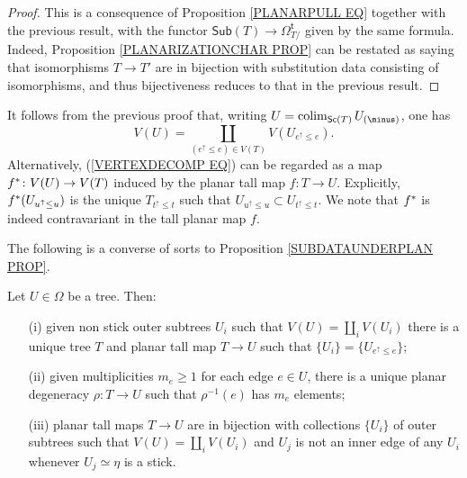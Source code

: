 \documentclass[a4paper,10pt]{article}%
\begin{document}
\begin{proof}
  This is a consequence of Proposition \ref{PLANARPULL EQ} together with the previous result, with the functor 
  $\mathsf{Sub}(T) \to \Omega_{T/}^{\mathsf{t}}$ given by the same formula.
  Indeed, Proposition \ref{PLANARIZATIONCHAR PROP} can be restated as saying that isomorphisms $T \to T'$ are in bijection with substitution data consisting of isomorphisms, and thus  bijectiveness reduces to that in the previous result.
\end{proof}


\begin{remark}\label{VERTEXDECOMP REM}
  It follows from the previous proof that, writing 
  $U = \colim_{\mathsf{Sc}(T)}U_{(\minus)}$,
  one has 
  \begin{equation}\label{VERTEXDECOMP EQ}
    V(U) = \coprod_{(e^{\uparrow} \leq e) \in V(T)}
    V(U_{e^{\uparrow} \leq e}).
  \end{equation}
  Alternatively, (\ref{VERTEXDECOMP EQ}) can be regarded as a map 
  $f^{\**} \colon V(U) \to V(T)$ induced by the planar tall map 
  $f \colon T \to U$.
  Explicitly, $f^{\**}(U_{u^{\uparrow} \leq u})$ 
  is the unique $T_{t^{\uparrow}\leq t}$ such that
  $U_{u^{\uparrow} \leq u} \subset U_{t^{\uparrow} \leq t}$. We note that $f^{\**}$ is indeed contravariant in the tall planar map $f$.
\end{remark}


The following is a converse of sorts to
Proposition \ref{SUBDATAUNDERPLAN PROP}.

\begin{proposition}\label{BUILDABLE PROP}
  Let $U \in \Omega$ be a tree. Then:
  \begin{itemize}
  \item[(i)] given non stick outer subtrees $U_i$ such that 
    $V(U) = \coprod_i V(U_i)$ there is a unique tree $T$ and planar tall map $T \to U$ such that $\{U_i\} = \{U_{e^{\uparrow}\leq e}\}$;
  \item[(ii)] given multiplicities $m_e \geq 1$ for each edge $e \in U$, there is a unique planar degeneracy $\rho \colon T \to U$ such that $\rho^{-1}(e)$ has $m_e$ elements;
  \item[(iii)] planar tall maps $T \to U$ are in bijection with collections $\{U_i\}$ of outer subtrees such that $V(U) = \coprod_i V(U_i)$ and $U_j$ is not an inner edge of any $U_i$ whenever $U_j \simeq \eta$ is a stick.
  \end{itemize}
\end{proposition}
\end{document}
